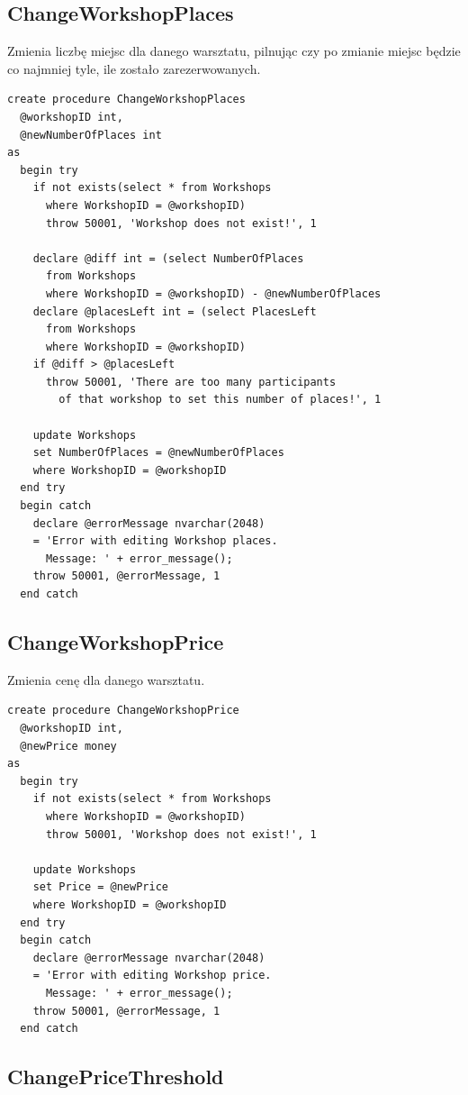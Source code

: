 \documentclass[12pt, a4paper]{mwrep}
\begin{document}
\subsection{ChangeWorkshopPlaces}

\noindent Zmienia liczbę miejsc dla danego warsztatu, pilnując czy po zmianie miejsc będzie co najmniej tyle, ile zostało zarezerwowanych.

\begin{lstlisting}
create procedure ChangeWorkshopPlaces
  @workshopID int,
  @newNumberOfPlaces int
as
  begin try
    if not exists(select * from Workshops 
      where WorkshopID = @workshopID)
      throw 50001, 'Workshop does not exist!', 1

    declare @diff int = (select NumberOfPlaces 
      from Workshops 
      where WorkshopID = @workshopID) - @newNumberOfPlaces
    declare @placesLeft int = (select PlacesLeft 
      from Workshops 
      where WorkshopID = @workshopID)
    if @diff > @placesLeft
      throw 50001, 'There are too many participants 
        of that workshop to set this number of places!', 1

    update Workshops
    set NumberOfPlaces = @newNumberOfPlaces
    where WorkshopID = @workshopID
  end try
  begin catch
    declare @errorMessage nvarchar(2048)
    = 'Error with editing Workshop places. 
      Message: ' + error_message();
    throw 50001, @errorMessage, 1
  end catch
\end{lstlisting}

\subsection{ChangeWorkshopPrice}

\noindent Zmienia cenę dla danego warsztatu.

\begin{lstlisting}
create procedure ChangeWorkshopPrice
  @workshopID int,
  @newPrice money
as
  begin try
    if not exists(select * from Workshops 
      where WorkshopID = @workshopID)
      throw 50001, 'Workshop does not exist!', 1

    update Workshops
    set Price = @newPrice
    where WorkshopID = @workshopID
  end try
  begin catch
    declare @errorMessage nvarchar(2048)
    = 'Error with editing Workshop price. 
      Message: ' + error_message();
    throw 50001, @errorMessage, 1
  end catch
\end{lstlisting}

\subsection{ChangePriceThreshold}
\end{document}
